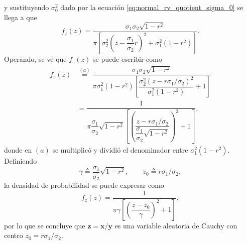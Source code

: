 \documentclass[a4paper]{report}
\newcommand{\x}{\mathbf{x}}
\newcommand{\y}{\mathbf{y}}
\newcommand{\z}{\mathbf{z}}
\begin{document}
y sustituyendo \(\sigma_0^2\) dado por la ecuación \ref{eq:normal_rv_quotient_sigma_0} se llega a que
\[
 f_z(z)=\dfrac{\sigma_1\sigma_2\sqrt{1-r^2}}{\pi\left[\sigma_2^2\left(z-\dfrac{\sigma_1}{\sigma_2}r\right)^2+\sigma_1^2(1-r^2)\right]}.
\]
Operando, se ve que \(f_z(z)\) se puede escribir como
\begin{align*}
 f_z(z)&\overset{(a)}{=}\dfrac{\sigma_1\sigma_2\sqrt{1-r^2}}{\pi\sigma_1^2(1-r^2)\left[\dfrac{\sigma_2^2\left(z-r\sigma_1/\sigma_2\right)^2}{\sigma_1^2(1-r^2)}+1\right]}\\
   &=\dfrac{1}{\pi\dfrac{\sigma_1}{\sigma_2}\sqrt{1-r^2}\left[\left(\dfrac{z-r\sigma_1/\sigma_2}{\dfrac{\sigma_1}{\sigma_2}\sqrt{1-r^2}}\right)^2+1\right]},
\end{align*}
donde en \((a)\) se multiplicó y dividió el denominador entre \(\sigma_1^2(1-r^2)\). Definiendo
\[
 \gamma\triangleq\frac{\sigma_1}{\sigma_2}\sqrt{1-r^2},\qquad z_0\triangleq r\sigma_1/\sigma_2,
\]
la densidad de probabilidad se puede expresar como
\begin{equation}\label{eq:cauchy_density_function}
 f_z(z)=\dfrac{1}{\pi\gamma\left[\left(\dfrac{z-z_0}{\gamma}\right)^2+1\right]},
\end{equation}
por lo que se concluye que \(\z=\x/\y\) es una variable aleatoria de Cauchy con centro \(z_0=r\sigma_1/\sigma_2\).
\end{document}

